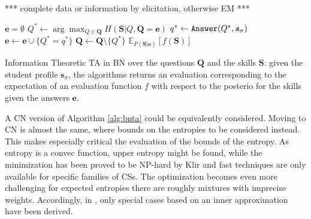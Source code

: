 \documentclass[runningheads]{llncs}
\begin{document}
*** complete data or information by elicitation, otherwise EM ***

\begin{algorithm}[htp!]
\begin{algorithmic}[1]
\STATE $\bm{e}=\emptyset$
\STATE $Q^* \gets \arg\max_{Q \in \bm{Q}} H(\bm{S}|Q,\bm{Q}=\bm{e})$
\STATE $q^* \gets {\tt{Answer}}(Q^*,\bm{s}_\sigma)$
\STATE $\bm{e} \gets \bm{e} \cup \{ Q^*=q^* \}$
\STATE $\bm{Q} \gets \bm{Q} \setminus \{ Q^*\}$
\ENDWHILE
{} $\mathbb{E}_{P(\bm{S}|\bm{e})}[f(\bm{S})]$
\end{algorithmic}
\caption{Information Theoretic TA in BN over the questions $\bm{Q}$ and the skills $\bm{S}$: given the student profile $\bm{s}_\sigma$, the algorithms returns an evaluation corresponding to the expectation of an evaluation function $f$ with respect to the posterio for the skills given the answers $\bm{e}$.\label{alg:bnta}}
\end{algorithm}

A CN version of Algorithm \ref{alg:bnta} could be equivalently considered. Moving to CN is almost the same, where bounds on the entropies to be considered instead. This makes especially critical the evaluation of the bounds of the entropy. As entropy is a convec function, upper entropy might be found, while the minimization has been proved to be NP-hard by Klir and fast techniques are only available for specific families of CSs. The optimization becomes even more challenging for expected entropies there are roughly mixtures with imprecise weights. Accordingly, in \cite{mangili2017b}, only special cases based on an inner approximation have been derived.
\end{document}
